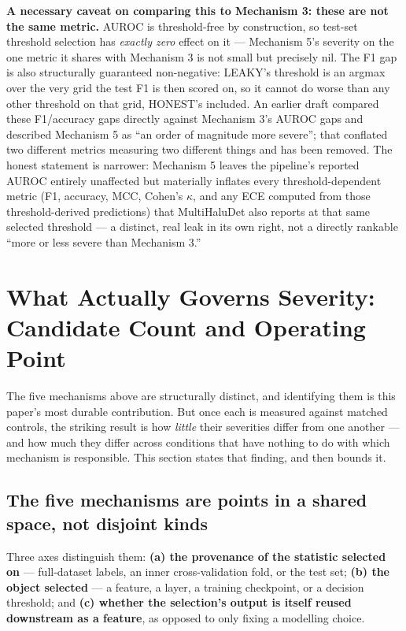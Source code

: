 \documentclass[10pt]{article} %
\begin{document}
\textbf{A necessary caveat on comparing this to Mechanism 3: these are not the
same metric.} AUROC is threshold-free by construction, so test-set threshold
selection has \emph{exactly zero} effect on it --- Mechanism 5's severity on
the one metric it shares with Mechanism 3 is not small but precisely nil. The
F1 gap is also structurally guaranteed non-negative: LEAKY's threshold is an
argmax over the very grid the test F1 is then scored on, so it cannot do worse
than any other threshold on that grid, HONEST's included. An earlier draft
compared these F1/accuracy gaps directly against Mechanism 3's AUROC gaps and
described Mechanism 5 as ``an order of magnitude more severe''; that conflated
two different metrics measuring two different things and has been removed. The
honest statement is narrower: Mechanism 5 leaves the pipeline's reported AUROC
entirely unaffected but materially inflates every threshold-dependent metric
(F1, accuracy, MCC, Cohen's $\kappa$, and any ECE computed from those
threshold-derived predictions) that MultiHaluDet also reports at that same
selected threshold --- a distinct, real leak in its own right, not a directly
rankable ``more or less severe than Mechanism 3.''

\section{What Actually Governs Severity: Candidate Count and Operating Point}
\label{sec:governs}

The five mechanisms above are structurally distinct, and identifying them is
this paper's most durable contribution. But once each is measured against
matched controls, the striking result is how \emph{little} their severities
differ from one another --- and how much they differ across conditions that
have nothing to do with which mechanism is responsible. This section states
that finding, and then bounds it.

\subsection{The five mechanisms are points in a shared space, not disjoint kinds}

Three axes distinguish them: \textbf{(a) the provenance of the statistic
selected on} --- full-dataset labels, an inner cross-validation fold, or the
test set; \textbf{(b) the object selected} --- a feature, a layer, a training
checkpoint, or a decision threshold; and \textbf{(c) whether the selection's
output is itself reused downstream as a feature}, as opposed to only fixing a
modelling choice.
\end{document}
